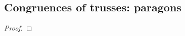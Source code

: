 \documentclass{svmult}
\begin{document}
\subsection{Congruences of trusses: paragons}

\begin{definition}

\end{definition}

\begin{example}

\begin{proposition}

\end{proposition}

\begin{proof}

\end{proof}

\end{example}




\end{document}
